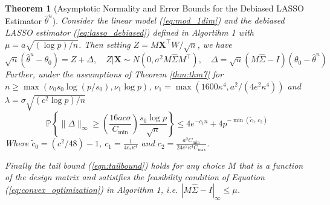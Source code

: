 \documentclass[10pt,a4paper]{amsart}
\newtheorem{theorem}{Theorem}
\begin{document}
\begin{theorem}[Asymptotic Normality and Error Bounds for the Debiased LASSO Estimator $\hat{\theta}^u$] 
    \label{thm:thm8}
    Consider the linear model (\ref{eq:mod_1dim}) and the debiased LASSO estimator (\ref{eq:lasso_debiased}) defined in Algortihm 1 with $\mu = a \sqrt{(\log p)/n}$. Then setting $Z = M\mathbf{X}^\top W/\sqrt{n}$, we have 
    \begin{equation}
        \sqrt{n}(\hat{\theta}^u - \theta_0) = Z + \Delta, \quad Z|\mathbf{X} \sim N(0, \sigma^2M \hat{\Sigma}M^\top), \quad \Delta = \sqrt{n}(M\hat{\Sigma}- I)(\theta_0 - \hat{\theta}^n)
    \end{equation}
    Further, under the assumptions of Theorem \ref{thm:thm7} for $n \ge \max(\nu_0s_0 \log(p/s_0), \nu_1 \log p)$, $\nu_1= \max(1600 \kappa^4, a^2/(4e^2\kappa^4))$ and $\lambda = \sigma \sqrt{(c^2 \log p)/n}$ 
    \begin{equation}
    \label{eqn:tailbound}
    \mathbb{P}\left\{\|\Delta\|_\infty \ge \left(\frac{16ac \sigma}{C_{\min}} \right)\frac{s_0 \log p}{\sqrt{n}}\right\} \le 4e^{-c_1n} + 4p^{-\min(\tilde{c}_0, c_2)}
    \end{equation}
    Where $\tilde{c}_0 = (c^2/48)-1$, $c_1 = \frac{1}{4c_* \kappa^4}$ and $c_2 = \frac{a^2 C_{\min}}{24 e^2 \kappa^4 C_{\max}}$. 
    \noindent
    
    Finally the tail bound (\ref{eqn:tailbound}) holds for any choice $M$ that is a function of the design matrix and satistfies the feasibility condition of Equation (\ref{eq:convex_optimization}) in Algorithm 1, i.e. $|M\hat{\Sigma}- I|_\infty \le \mu$.
\end{theorem}
\end{document}
